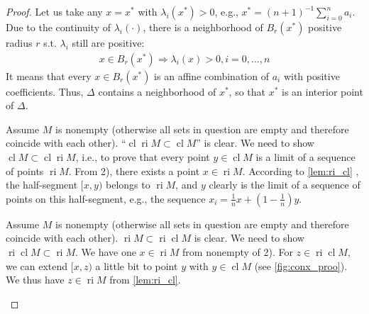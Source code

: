 \documentclass{article}
\newcommand{\cl}{\operatorname{cl}}
\newcommand{\ri}{\operatorname{ri}}
\begin{document}
\begin{proof}
Let us take any $x=x^{*}$ with $\lambda_{i}\left(x^{*}\right)>0$, e.g., $x^{*}=(n+1)^{-1} \sum_{i=0}^{n} a_{i}$. Due to the continuity of $\lambda_{i}(\cdot)$, there is a neighborhood of $B_{r}\left(x^{*}\right)$ positive radius $r$ s.t. $\lambda_{i}$ still are positive:
\begin{align*}
x \in B_{r}\left(x^{*}\right) \Rightarrow \lambda_{i}(x) > 0, i=0, \ldots, n
\end{align*}
It  means that every $x \in B_{r}\left(x^{*}\right)$ is an affine combination of $a_{i}$ with positive coefficients. Thus, $\Delta$ contains a neighborhood of $x^{*}$, so that $x^{*}$ is an interior point of $\Delta$.

  Assume $M$ is nonempty (otherwise all sets in question are empty and therefore coincide with each other).  ``$\cl \ri M\subset \cl M$'' is clear.  We need to show $\operatorname{cl} M \subset \cl \ri M$, i.e., to prove that every point $y \in \operatorname{cl} M$ is a limit of a sequence of points  $\ri M$.
From 2), there exists a point $x \in \operatorname{ri} M$. According to \cref{lem:ri_cl} , the half-segment $[x, y)$ belongs to $\ri M$, and $y$ clearly is the limit of a sequence of points on this half-segment, e.g., the sequence $x_{i}=\frac{1}{n} x+\left(1-\frac{1}{n}\right) y .$

  Assume $M$ is nonempty (otherwise all sets in question are empty and therefore coincide with each other).  $\ri M\subset \ri \cl M$ is clear.  We need to show $ \ri \cl M \subset \ri M$. We have one $x\in \ri M$ from nonempty of 2). For $z\in \ri\cl M$, we can extend $[x,z)$ a little bit to point $y$ with $y\in\cl M$ (see \cref{fig:conx_proo}).  We thus have $z\in \ri M$ from  \cref{lem:ri_cl}.

\begin{figure}[H]
\centering





\begin{tikzpicture}[x=0.75pt,y=0.75pt,yscale=-1,xscale=1]


\end{tikzpicture}
\end{figure}
\end{proof}
\end{document}
